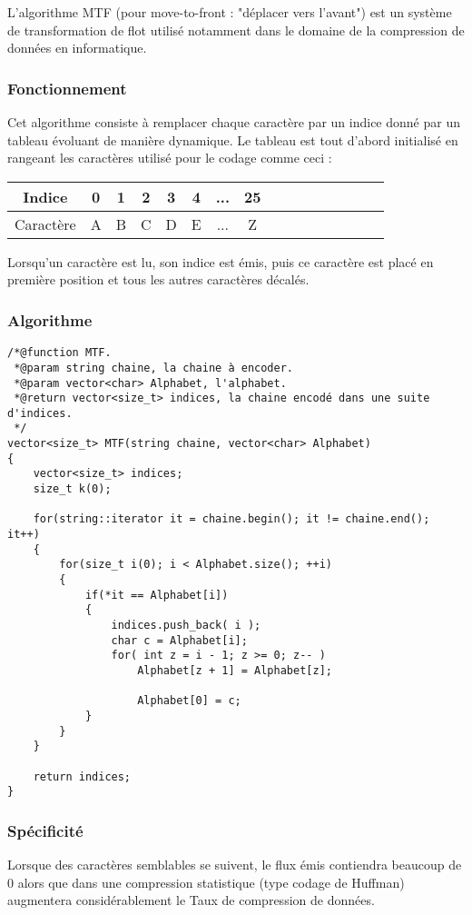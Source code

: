 \par L'algorithme MTF (pour move-to-front : "déplacer vers l'avant") est un système de transformation de flot utilisé notamment dans le domaine de la compression de données en informatique. 

\subsubsection{Fonctionnement}
\par Cet algorithme consiste à remplacer chaque caractère par un indice donné par un tableau évoluant de manière dynamique. 
Le tableau est tout d'abord initialisé en rangeant les caractères utilisé pour le codage comme ceci : \\

\begin{tabular}{|c|c|c|c|c|c|c|c|c|c|c|c|c|c|c|c|}
    \hline
    Indice & 0 & 1 & 2 & 3 & 4 & ... & 25\\
    \hline
    Caractère & A & B & C & D & E & ... & Z\\
    \hline
\end{tabular}

\par Lorsqu'un caractère est lu, son indice est émis, puis ce caractère est placé en première position et tous les autres caractères décalés.

\subsubsection{Algorithme}
\begin{verbatim}
/*@function MTF.
 *@param string chaine, la chaine à encoder.
 *@param vector<char> Alphabet, l'alphabet.
 *@return vector<size_t> indices, la chaine encodé dans une suite d'indices.
 */
vector<size_t> MTF(string chaine, vector<char> Alphabet)
{
	vector<size_t> indices;
	size_t k(0);

	for(string::iterator it = chaine.begin(); it != chaine.end(); it++)
	{
		for(size_t i(0); i < Alphabet.size(); ++i)
		{
			if(*it == Alphabet[i])
			{
				indices.push_back( i );
				char c = Alphabet[i];
				for( int z = i - 1; z >= 0; z-- )
	    			Alphabet[z + 1] = Alphabet[z];
 
        			Alphabet[0] = c;
			}
		}
	}
	
	return indices;
}
\end{verbatim}


\subsubsection{Spécificité}
\par Lorsque des caractères semblables se suivent, le flux émis contiendra beaucoup de 0 alors que dans une compression statistique (type codage de Huffman) augmentera considérablement le Taux de compression de données.

